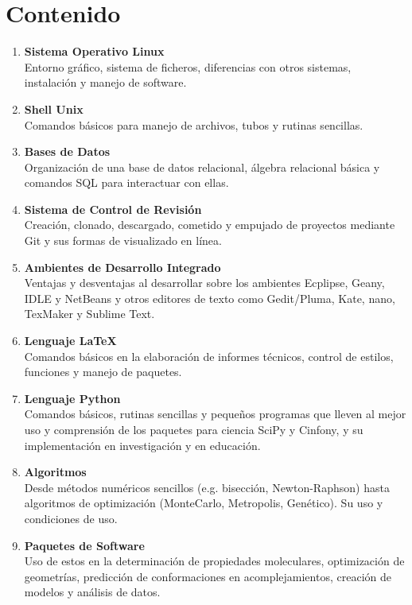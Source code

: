 \documentclass[10pt,letterpaper]{article}
\begin{document}
\section{Contenido}
\begin{enumerate}
\item \textbf{Sistema Operativo Linux}\\ Entorno gr\'afico, sistema de ficheros, diferencias con otros sistemas, instalaci\'on y manejo de software.
\item \textbf{Shell Unix}\\ Comandos b\'asicos para manejo de archivos, tubos y rutinas sencillas.
\item \textbf{Bases de Datos}\\ Organizaci\'on de una base de datos relacional, \'algebra relacional b\'asica y comandos SQL para interactuar con ellas.
\item \textbf{Sistema de Control de Revisi\'on}\\ Creaci\'on, clonado, descargado, cometido y empujado de proyectos mediante Git y sus formas de visualizado en l\'inea.
\item \textbf{Ambientes de Desarrollo Integrado}\\ Ventajas y desventajas al desarrollar sobre los ambientes Ecplipse, Geany, IDLE y NetBeans y otros editores de texto como Gedit/Pluma, Kate, nano, TexMaker y Sublime Text.
\item \textbf{Lenguaje \LaTeX\ }\\ Comandos b\'asicos en la elaboraci\'on de informes t\'ecnicos, control de estilos, funciones y manejo de paquetes.
\item \textbf{Lenguaje Python}\\ Comandos b\'asicos, rutinas sencillas y peque\~nos programas que lleven al mejor uso y comprensi\'on de los paquetes para ciencia SciPy y Cinfony, y su implementaci\'on en investigaci\'on y en educaci\'on.
\item \textbf{Algoritmos}\\ Desde m\'etodos num\'ericos sencillos (e.g. bisecci\'on, Newton-Raphson) hasta algoritmos de optimizaci\'on (MonteCarlo, Metropolis, Gen\'etico). Su uso y condiciones de uso.
\item \textbf{Paquetes de Software}\\ Uso de estos en la determinaci\'on de propiedades moleculares, optimizaci\'on de geometr\'ias, predicci\'on de conformaciones en acomplejamientos, creaci\'on de modelos y an\'alisis de datos.
\end{enumerate}
\end{document}

